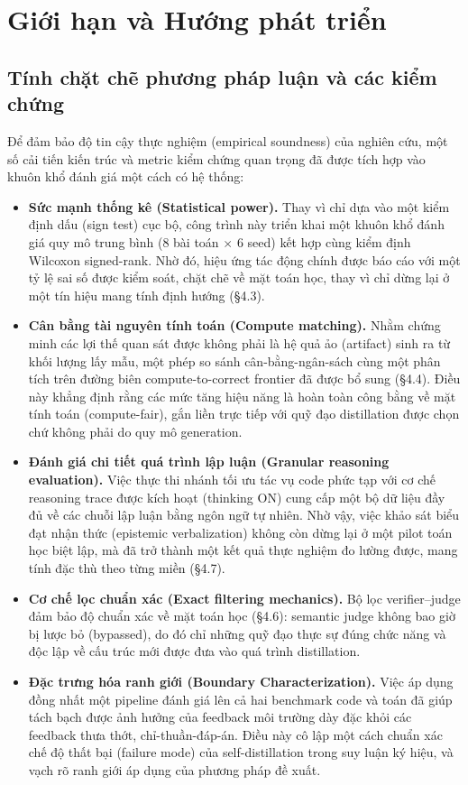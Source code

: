 \chapter{Giới hạn và Hướng phát triển}\label{chapter-6-limitations-and-publication-roadmap}

\section{Tính chặt chẽ phương pháp luận và các kiểm chứng}\label{methodological-rigor-and-validations}

Để đảm bảo độ tin cậy thực nghiệm (empirical soundness) của nghiên cứu, một số cải tiến kiến trúc và metric kiểm chứng quan trọng đã được tích hợp vào khuôn khổ đánh giá một cách có hệ thống:

\begin{itemize}
\tightlist
\item
  \textbf{Sức mạnh thống kê (Statistical power).} Thay vì chỉ dựa vào một kiểm định dấu (sign test) cục bộ, công trình này triển khai một khuôn khổ đánh giá quy mô trung bình (8 bài toán $\times$ 6 seed) kết hợp cùng kiểm định Wilcoxon signed-rank. Nhờ đó, hiệu ứng tác động chính được báo cáo với một tỷ lệ sai số được kiểm soát, chặt chẽ về mặt toán học, thay vì chỉ dừng lại ở một tín hiệu mang tính định hướng (§4.3).
\item
  \textbf{Cân bằng tài nguyên tính toán (Compute matching).} Nhằm chứng minh các lợi thế quan sát được không phải là hệ quả ảo (artifact) sinh ra từ khối lượng lấy mẫu, một phép so sánh cân-bằng-ngân-sách cùng một phân tích trên đường biên compute-to-correct frontier đã được bổ sung (§4.4). Điều này khẳng định rằng các mức tăng hiệu năng là hoàn toàn công bằng về mặt tính toán (compute-fair), gắn liền trực tiếp với quỹ đạo distillation được chọn chứ không phải do quy mô generation.
\item
  \textbf{Đánh giá chi tiết quá trình lập luận (Granular reasoning evaluation).} Việc thực thi nhánh tối ưu tác vụ code phức tạp với cơ chế reasoning trace được kích hoạt (thinking ON) cung cấp một bộ dữ liệu đầy đủ về các chuỗi lập luận bằng ngôn ngữ tự nhiên. Nhờ vậy, việc khảo sát biểu đạt nhận thức (epistemic verbalization) không còn dừng lại ở một pilot toán học biệt lập, mà đã trở thành một kết quả thực nghiệm đo lường được, mang tính đặc thù theo từng miền (§4.7).
\item
  \textbf{Cơ chế lọc chuẩn xác (Exact filtering mechanics).} Bộ lọc verifier--judge đảm bảo độ chuẩn xác về mặt toán học (§4.6): semantic judge không bao giờ bị lược bỏ (bypassed), do đó chỉ những quỹ đạo thực sự đúng chức năng và độc lập về cấu trúc mới được đưa vào quá trình distillation.
\item
  \textbf{Đặc trưng hóa ranh giới (Boundary Characterization).} Việc áp dụng đồng nhất một pipeline đánh giá lên cả hai benchmark code và toán đã giúp tách bạch được ảnh hưởng của feedback môi trường dày đặc khỏi các feedback thưa thớt, chỉ-thuần-đáp-án. Điều này cô lập một cách chuẩn xác chế độ thất bại (failure mode) của self-distillation trong suy luận ký hiệu, và vạch rõ ranh giới áp dụng của phương pháp đề xuất.
\end{itemize}

